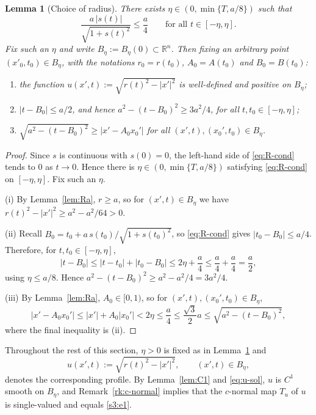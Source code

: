 \documentclass[12pt,letterpaper]{amsart}
\theoremstyle{definition}
\theoremstyle{plain}
\newtheorem{lemma}[definition]{Lemma}
\numberwithin{equation}{section}
\newcommand{\R}{\mathbb{R}}
\begin{document}
\begin{lemma}[Choice of radius]\label{lem:radius}
    There exists $\eta\in(0,\min\{T,a/8\})$ such that
    \begin{equation}\label{eq:R-cond}
        \frac{a\,|s(t)|}{\sqrt{1+s(t)^2}}\leq\frac a4\qquad\text{for all }t\in[-\eta,\eta].
    \end{equation}
    Fix such an $\eta$ and write $B_\eta:=B_\eta(0)\subset\R^n$. Then fixing an arbitrary point $(x'_0,t_0)\in B_\eta$, with the notations
    $r_0=r(t_0)$, $A_0=A(t_0)$ and $B_0=B(t_0)$:
    \begin{enumerate}
        \item[\rm(i)] the function $u(x',t):=\sqrt{r(t)^2-|x'|^2}$ is well-defined and positive
        on $B_\eta$;
        \item[\rm(ii)] $|t-B_0|\leq a/2$, and hence $a^2-(t-B_0)^2\geq 3a^2/4$, for all
        $t,t_0\in[-\eta,\eta]$;
        \item[\rm(iii)] $\sqrt{a^2-(t-B_0)^2}\geq|x'-A_0x_0'|$ for all
        $(x',t),(x_0',t_0)\in B_\eta$.
    \end{enumerate}
\end{lemma}
\begin{proof}
    Since $s$ is continuous with $s(0)=0$, the left-hand side of \eqref{eq:R-cond} tends to $0$
    as $t\to0$.
Hence there is $\eta\in(0,\min\{T,a/8\})$ satisfying \eqref{eq:R-cond} on
    $[-\eta,\eta]$. Fix such an $\eta$.

    (i) By Lemma~\ref{lem:Ra}, $r\geq a$, so for $(x',t)\in B_\eta$ we have
    $r(t)^2-|x'|^2\geq a^2-a^2/64>0$.

    (ii) Recall $B_0=t_0+a\,s(t_0)/\sqrt{1+s(t_0)^2}$, so \eqref{eq:R-cond} gives
    $|t_0-B_0|\leq a/4$. Therefore, for $t,t_0\in[-\eta,\eta]$,
    \[
        |t-B_0|\leq|t-t_0|+|t_0-B_0|\leq 2\eta+\frac a4\leq\frac a4+\frac a4=\frac a2,
    \]
    using $\eta\leq a/8$. Hence $a^2-(t-B_0)^2\geq a^2-a^2/4=3a^2/4$.

    (iii) By Lemma~\ref{lem:Ra}, $A_0\in[0,1)$, so for $(x',t),(x_0',t_0)\in B_\eta$,
    \[
        |x'-A_0x_0'|\leq|x'|+A_0|x_0'|<2\eta\leq\frac a4\leq\frac{\sqrt3}{2}a
        \leq\sqrt{a^2-(t-B_0)^2},
    \]
    where the final inequality is (ii).
\end{proof}

Throughout the rest of this section, $\eta>0$ is fixed as in Lemma~\ref{lem:radius} and
\begin{equation}\label{eq:u-sol}
    u(x',t):=\sqrt{r(t)^2-|x'|^2},\qquad(x',t)\in B_\eta,
\end{equation}
denotes the corresponding profile.
By Lemma~\ref{lem:C1} and \eqref{eq:u-sol}, $u$ is $C^1$ smooth on $B_\eta$, and Remark~\ref{rk:c-normal} implies that the $c$-normal map $T_u$ of $u$ is single-valued and equals \eqref{s3:e1}.
\end{document}
